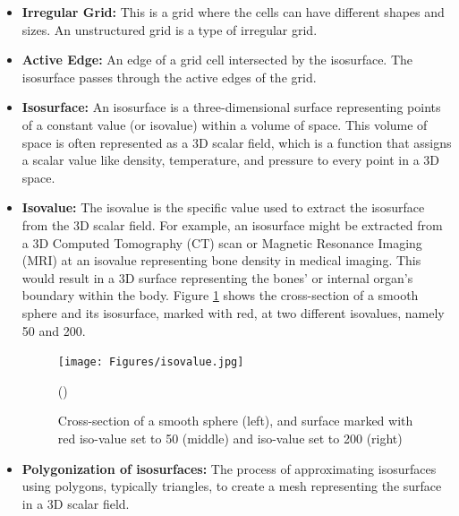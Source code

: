 \begin{itemize}
    \vspace{1.5mm}
    \item \textbf{Irregular Grid:} This is a grid where the cells can have different shapes and sizes. An unstructured grid is a type of irregular grid.
    \vspace{1.5mm}
    \item \textbf{Active Edge:} An edge of a grid cell intersected by the isosurface. The isosurface passes through the active edges of the grid.
    \vspace{1.5mm}
    \item \textbf{Isosurface:} An isosurface is a three-dimensional surface representing points of a constant value (or isovalue) within a volume of space. This volume of space is often represented as a 3D scalar field, which is a function that assigns a scalar value like density, temperature, and pressure to every point in a 3D space.
    \vspace{1.5mm}
    \item \textbf{Isovalue:} The isovalue is the specific value used to extract the isosurface from the 3D scalar field. For example, an isosurface might be extracted from a 3D Computed Tomography (CT) scan or Magnetic Resonance Imaging (MRI) at an isovalue representing bone density in medical imaging. This would result in a 3D surface representing the bones' or internal organ's boundary within the body. Figure \ref{fig:isovalue} shows the cross-section of a smooth sphere and its isosurface, marked with red, at two different isovalues, namely 50 and 200.
    

    \begin{figure}
    \centering
    \texttt{[image: Figures/isovalue.jpg]}
    \decoRule
    \caption{Cross-section of a smooth sphere (left), and surface marked with red iso-value set to 50 (middle) and iso-value set to 200 (right)}(\cite{image_quadtree_structured_unstructured})
    \label{fig:isovalue}
    \end{figure}
    
    \vspace{1.5mm}
    \item \textbf{Polygonization of isosurfaces:} The process of approximating isosurfaces using polygons, typically triangles, to create a mesh representing the surface in a 3D scalar field.
\end{itemize}


